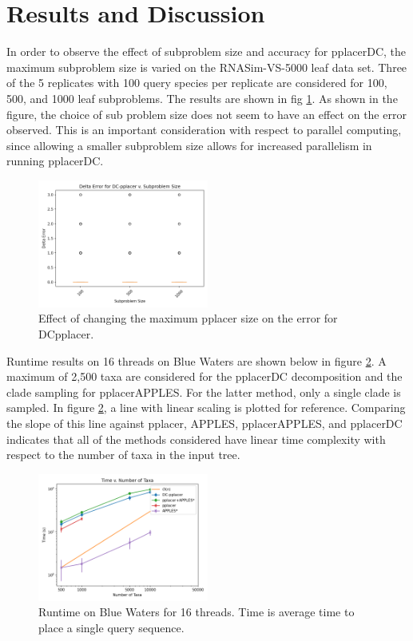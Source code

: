 \documentclass[10pt]{article}
\begin{document}
\section{Results and Discussion}

In order to observe the effect of subproblem size and accuracy for pplacerDC,
the maximum subproblem size is varied on the RNASim-VS-5000 leaf data set.
Three of the 5 replicates with 100 query species per replicate are
considered for 100, 500, and 1000 leaf subproblems.
The results are shown in fig \ref{fig:varying-size}.
As shown in the figure, the choice of sub problem size does not seem
to have an effect on the error observed.
This is an important consideration with respect to parallel computing,
since allowing a smaller subproblem size allows
for increased parallelism in running pplacerDC.
\begin{figure}
\centering
\includegraphics[width=0.5\textwidth]{Figs/varying-subproblem-size.png}
\caption{Effect of changing the maximum pplacer size on the error for DCpplacer.}
\label{fig:varying-size}
\end{figure}
Runtime results on 16 threads on Blue Waters are shown below in figure \ref{fig:timing-results}.
A maximum of 2,500 taxa are considered for the pplacerDC decomposition and the clade
sampling for pplacerAPPLES.
For the latter method, only a single clade is sampled.
In figure \ref{fig:timing-results}, a line with linear scaling is plotted for reference.
Comparing the slope of this line against pplacer, APPLES, pplacerAPPLES, and pplacerDC
indicates that all of the methods considered have linear time complexity with respect
to the number of taxa in the input tree.
\begin{figure}
\centering
\includegraphics[width=0.5\textwidth]{Figs/VS-timing-results-BW.png}
\caption{Runtime on Blue Waters for 16 threads. Time is average time to place a single query sequence.}
\label{fig:timing-results}
\end{figure}
\end{document}
